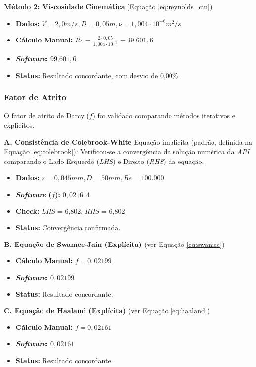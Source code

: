 \textbf{Método 2: Viscosidade Cinemática}
(Equação \ref{eq:reynolds_cin})
\begin{itemize}
    \item \textbf{Dados:} $V=2,0 m/s, D=0,05 m, \nu=1,004 \cdot 10^{-6} m^2/s$
    \item \textbf{Cálculo Manual:} $Re = \frac{2 \cdot 0,05}{1,004 \cdot 10^{-6}} = 99.601,6$
    \item \textbf{\textit{Software}:} $99.601,6$
    \item \textbf{Status:} Resultado concordante, com desvio de 0,00\%.
\end{itemize}

\subsubsection{Fator de Atrito}
O fator de atrito de Darcy ($f$) foi validado comparando métodos iterativos e explícitos.

\textbf{A. Consistência de Colebrook-White \cite{colebrook1939}}
Equação implícita (padrão, definida na Equação \ref{eq:colebrook}):
Verificou-se a convergência da solução numérica da \textit{API} comparando o Lado Esquerdo (\textit{LHS}) e Direito (\textit{RHS}) da equação.
\begin{itemize}
    \item \textbf{Dados:} $\varepsilon=0,045mm, D=50mm, Re=100.000$
    \item \textbf{\textit{Software} ($f$):} $0,021614$
    \item \textbf{Check:} \textit{LHS} = 6,802; \textit{RHS} = 6,802
    \item \textbf{Status:} Convergência confirmada.
\end{itemize}

\textbf{B. Equação de Swamee-Jain (Explícita) \cite{swamee1976}}
(ver Equação \ref{eq:swamee})
\begin{itemize}
    \item \textbf{Cálculo Manual:} $f = 0,02199$
    \item \textbf{\textit{Software}:} $0,02199$
    \item \textbf{Status:} Resultado concordante.
\end{itemize}

\textbf{C. Equação de Haaland (Explícita) \cite{haaland1983}}
(ver Equação \ref{eq:haaland})
\begin{itemize}
    \item \textbf{Cálculo Manual:} $f = 0,02161$
    \item \textbf{\textit{Software}:} $0,02161$
    \item \textbf{Status:} Resultado concordante.
\end{itemize}

